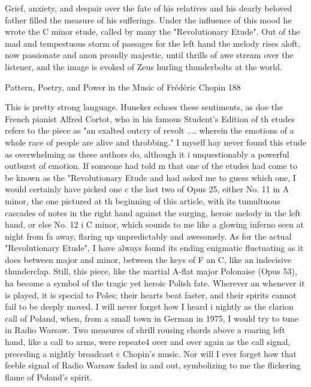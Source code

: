    Grief, anxiety, and despair over the fate of his relatives and his dearly beloved
   father filled the measure of his sufferings. Under the influence of this mood he
   wrote the C minor etude, called by many the "Revolutionary Etude". Out of the
   mad and tempestuous storm of passages for the left hand the melody rises aloft,
   now passionate and anon proudly majestic, until thrills of awe stream over the
   listener, and the image is evoked of Zeus hurling thunderbolts at the world.




Pattern, Poetry, and Power in the Music of Frédéric Chopin                               188

This is pretty strong language. Huneker echoes these sentiments, as doe the French
pianist Alfred Cortot, who in his famous Student's Edition of th etudes refers to the piece
as "an exalted outcry of revolt .... wherein the emotions of a whole race of people are
alive and throbbing." I myself hay never found this etude as overwhelming as these
authors do, although it i unquestionably a powerful outburst of emotion. If someone had
told m that one of the etudes had come to be known as the "Revolutionary Etude and had
asked me to guess which one, I would certainly have picked one c the last two of Opus
25, either No. 11 in A minor, the one pictured at th beginning of this article, with its
tumultuous cascades of notes in the right hand against the surging, heroic melody in the
left hand, or else No. 12 i C minor, which sounds to me like a glowing inferno seen at
night from fa away, flaring up unpredictably and awesomely. As for the actual
"Revolutionary Etude", I have always found its ending enigmatic fluctuating as it does
between major and minor, between the keys of F an C, like an indecisive thunderclap.
        Still, this piece, like the martial A-flat major Polonaise (Opus 53), ha become a
symbol of the tragic yet heroic Polish fate. Wherever an whenever it is played, it is
special to Poles; their hearts beat faster, and their spirits cannot fail to be deeply moved. I
will never forget how I heard i nightly as the clarion call of Poland, when, from a small
town in German in 1975, I would try to tune in Radio Warsaw. Two measures of shrill
rousing chords above a roaring left hand, like a call to arms, were repeate4 over and over
again as the call signal, preceding a nightly broadcast c Chopin's music. Nor will I ever
forget how that feeble signal of Radio Warsaw faded in and out, symbolizing to me the
flickering flame of Poland's spirit.


